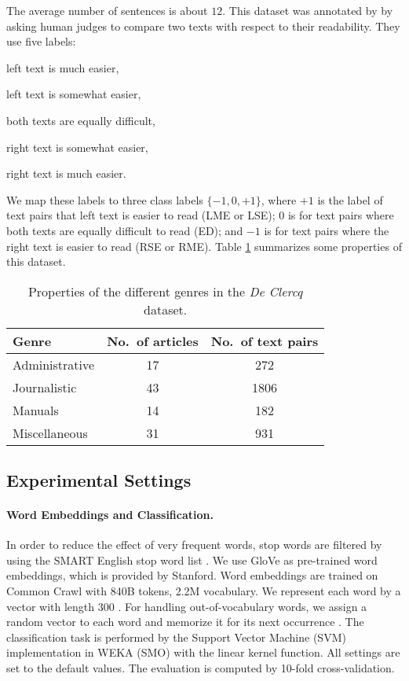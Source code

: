 The average number of sentences is about $12$. 
This dataset was annotated by  by asking human judges to compare two texts with respect to their readability. 
They use five labels:

\squishlist
\item[\textbf{LME:}] left text is much easier,
\item[\textbf{LSE:}] left text is somewhat easier, 
\item[\textbf{ED:}] both texts are equally difficult,
\item[\textbf{RSE:}] right text is somewhat easier,
\item[\textbf{RME:}] right text is much easier.
\squishend

We map these labels to three class labels $\lbrace -1, 0, +1 \rbrace$, where $+1$ is the label of text pairs that left text is easier to read (LME or LSE); $0$ is for text pairs where both texts are equally difficult to read (ED); and  $-1$ is for text pairs where the right text is easier to read (RSE or RME). 
Table \ref{table:genre_prop} summarizes some properties of this dataset.

\begin{table}[!h]
\centering
\begin{tabular}{lcc}
\hline
Genre & No.\ of articles & No.\ of text pairs \\\hline
Administrative & 17 & 272 \\
Journalistic & 43 & 1806 \\
Manuals & 14 & 182 \\
Miscellaneous & 31 & 931\\\hline
\end{tabular}
\caption{Properties of the different genres in the \emph{De Clercq} dataset.}
\label{table:genre_prop}
\end{table}

\subsection{Experimental Settings}
\paragraph{Word Embeddings and Classification.} In order to reduce the effect of very frequent words, stop words are filtered by using the SMART English stop word list \cite{salton71}. 
We use GloVe as \mbox{pre-trained} word embeddings, which is provided by Stanford. 
Word embeddings are trained on Common Crawl with 840B tokens, 2.2M vocabulary. 
We represent each word by a vector with length 300 \cite{pennington14}. 
For handling \mbox{out-of-vocabulary} words, we assign a random vector to each word and memorize it for its next occurrence \cite{kusner15}. 
The classification task is performed by the Support Vector Machine (SVM) implementation in WEKA (SMO) with the linear kernel function.  
All settings are set to the default values. 
The evaluation is computed by \mbox{10-fold} \mbox{cross-validation}. 

